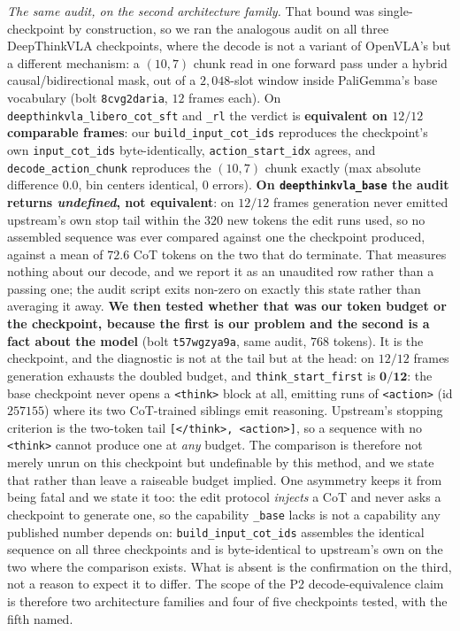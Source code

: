 \documentclass{article}
\begin{document}
\emph{The same audit, on the second architecture family.} That bound was single-checkpoint by construction, so we ran the analogous audit on all three DeepThinkVLA checkpoints, where the decode is not a variant of OpenVLA's but a different mechanism: a $(10,7)$ chunk read in one forward pass under a hybrid causal/bidirectional mask, out of a $2{,}048$-slot window inside PaliGemma's base vocabulary (bolt \texttt{8cvg2daria}, $12$ frames each). On \texttt{deepthinkvla\_libero\_cot\_sft} and \texttt{\_rl} the verdict is \textbf{equivalent on $12/12$ comparable frames}: our \texttt{build\_input\_cot\_ids} reproduces the checkpoint's own \texttt{input\_cot\_ids} byte-identically, \texttt{action\_start\_idx} agrees, and \texttt{decode\_action\_chunk} reproduces the $(10,7)$ chunk exactly (max absolute difference $0.0$, bin centers identical, $0$ errors). \textbf{On \texttt{deepthinkvla\_base} the audit returns \emph{undefined}, not equivalent}: on $12/12$ frames generation never emitted upstream's own stop tail within the $320$ new tokens the edit runs used, so no assembled sequence was ever compared against one the checkpoint produced, against a mean of $72.6$ CoT tokens on the two that do terminate. That measures nothing about our decode, and we report it as an unaudited row rather than a passing one; the audit script exits non-zero on exactly this state rather than averaging it away. \textbf{We then tested whether that was our token budget or the checkpoint, because the first is our problem and the second is a fact about the model} (bolt \texttt{t57wgzya9a}, same audit, $768$ tokens). It is the checkpoint, and the diagnostic is not at the tail but at the head: on $12/12$ frames generation exhausts the doubled budget, and \texttt{think\_start\_first} is $\mathbf{0/12}$: the base checkpoint never opens a \texttt{<think>} block at all, emitting runs of \texttt{<action>} (id $257155$) where its two CoT-trained siblings emit reasoning. Upstream's stopping criterion is the two-token tail \texttt{[</think>, <action>]}, so a sequence with no \texttt{<think>} cannot produce one at \emph{any} budget. The comparison is therefore not merely unrun on this checkpoint but undefinable by this method, and we state that rather than leave a raiseable budget implied. One asymmetry keeps it from being fatal and we state it too: the edit protocol \emph{injects} a CoT and never asks a checkpoint to generate one, so the capability \texttt{\_base} lacks is not a capability any published number depends on: \texttt{build\_input\_cot\_ids} assembles the identical sequence on all three checkpoints and is byte-identical to upstream's own on the two where the comparison exists. What is absent is the confirmation on the third, not a reason to expect it to differ. The scope of the P2 decode-equivalence claim is therefore two architecture families and four of five checkpoints tested, with the fifth named.
\end{document}
